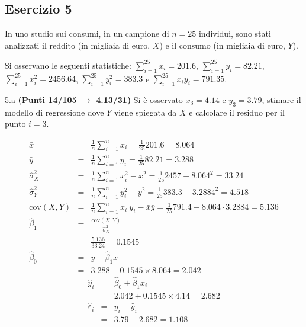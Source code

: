 \documentclass[
  11pt,
]{book}
\theoremstyle{mytheoremstyle}
\theoremstyle{mydefstyle}
\newenvironment{sol}
  {
  \begin{tcolorbox}[enhanced,breakable,arc=0.1mm,boxrule=1pt,colback=white,colframe=iblue,
  title=\bf \fontfamily{lmss}\selectfont \hspace{.5 cm} Soluzione,drop fuzzy shadow]

}{
\end{tcolorbox}
  }
\begin{document}
\subsection{Esercizio 5}\label{esercizio-5-35}

In uno studio sui consumi, in un campione di \(n=25\) individui, sono stati analizzati il reddito (in migliaia di euro, \(X\)) e il consumo (in migliaia di euro, \(Y\)).

Si osservano le seguenti statistiche:
\(\sum_{i=1}^{25}x_i=201.6\), \(\sum_{i=1}^{25}y_i=82.21\),
\(\sum_{i=1}^{25}x_i^2=2456.64\), \(\sum_{i=1}^{25}y_i^2=383.3\) e \(\sum_{i=1}^{25}x_iy_i=791.35\).

5.a \textbf{(Punti 14/105 \(\rightarrow\) 4.13/31)} Si è osservato \(x_3=4.14\) e \(y_3=3.79\), stimare il modello di regressione dove \(Y\) viene spiegata da \(X\) e calcolare il residuo per il punto \(i=3\).

\begin{sol}
\begin{eqnarray*}
           \bar x &=&\frac 1 n\sum_{i=1}^n x_i = \frac {1}{ 25 }  201.6 =  8.064 \\
           \bar y &=&\frac 1 n\sum_{i=1}^n y_i = \frac {1}{ 25 }  82.21 =  3.288 \\
           \hat\sigma_X^2&=&\frac 1 n\sum_{i=1}^n x_i^2-\bar x^2=\frac {1}{ 25 }  2457  - 8.064 ^2= 33.24 \\
           \hat\sigma_Y^2&=&\frac 1 n\sum_{i=1}^n y_i^2-\bar y^2=\frac {1}{ 25 }  383.3  - 3.2884 ^2= 4.518 \\
           \text{cov}(X,Y)&=&\frac 1 n\sum_{i=1}^n x_i~y_i-\bar x\bar y=\frac {1}{ 25 }  791.4 - 8.064 \cdot 3.2884 = 5.136 \\
           \hat\beta_1 &=& \frac{\text{cov}(X,Y)}{\hat\sigma_X^2} \\
                    &=& \frac{ 5.136 }{ 33.24 }  =  0.1545 \\
           \hat\beta_0 &=& \bar y - \hat\beta_1 \bar x\\
                    &=&  3.288 - 0.1545 \times  8.064 = 2.042 
         \end{eqnarray*}\begin{eqnarray*}
\hat y_i &=&\hat\beta_0+\hat\beta_1 x_i=\\ 
&=& 2.042 + 0.1545 \times 4.14 = 2.682 \\ 
\hat \varepsilon_i &=& y_i-\hat y_i\\ 
&=& 3.79 - 2.682 = 1.108  
\end{eqnarray*}

\end{sol}
\end{document}

